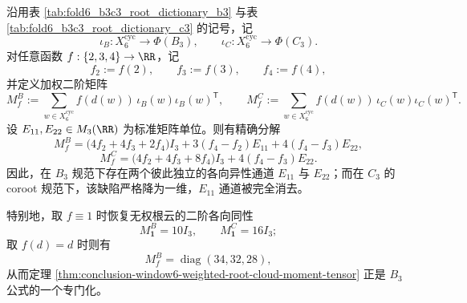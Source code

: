 \begin{theorem}\label{thm:conclusion-window6-b3c3-anisotropy-rank-drop}
沿用表 \ref{tab:fold6_b3c3_root_dictionary_b3} 与表 \ref{tab:fold6_b3c3_root_dictionary_c3} 的记号，记
\[
\iota_B:X_6^{\mathrm{cyc}}\to \Phi(B_3),
\qquad
\iota_C:X_6^{\mathrm{cyc}}\to \Phi(C_3).
\]
对任意函数 \(f:\{2,3,4\}\to\RR\)，记
\[
f_2:=f(2),\qquad f_3:=f(3),\qquad f_4:=f(4),
\]
并定义加权二阶矩阵
\[
M_f^{B}:=\sum_{w\in X_6^{\mathrm{cyc}}} f(d(w))\,\iota_B(w)\iota_B(w)^{\mathsf T},
\qquad
M_f^{C}:=\sum_{w\in X_6^{\mathrm{cyc}}} f(d(w))\,\iota_C(w)\iota_C(w)^{\mathsf T}.
\]
设 \(E_{11},E_{22}\in M_3(\RR)\) 为标准矩阵单位。则有精确分解
\[
\boxed{\;
M_f^{B}
=
\bigl(4f_2+4f_3+2f_4\bigr)I_3
+3(f_4-f_2)E_{11}
+4(f_4-f_3)E_{22},\;}
\]
\[
\boxed{\;
M_f^{C}
=
\bigl(4f_2+4f_3+8f_4\bigr)I_3
+4(f_4-f_3)E_{22}.\;}
\]
因此，在 \(B_3\) 规范下存在两个彼此独立的各向异性通道 \(E_{11}\) 与 \(E_{22}\)；而在 \(C_3\) 的 coroot 规范下，该缺陷严格降为一维，\(E_{11}\) 通道被完全消去。

特别地，取 \(f\equiv 1\) 时恢复无权根云的二阶各向同性
\[
M_{\mathbf 1}^{B}=10I_3,
\qquad
M_{\mathbf 1}^{C}=16I_3;
\]
取 \(f(d)=d\) 时则有
\[
M_f^{B}=\operatorname{diag}(34,32,28),
\]
从而定理 \ref{thm:conclusion-window6-weighted-root-cloud-moment-tensor} 正是 \(B_3\) 公式的一个专门化。
\end{theorem}
